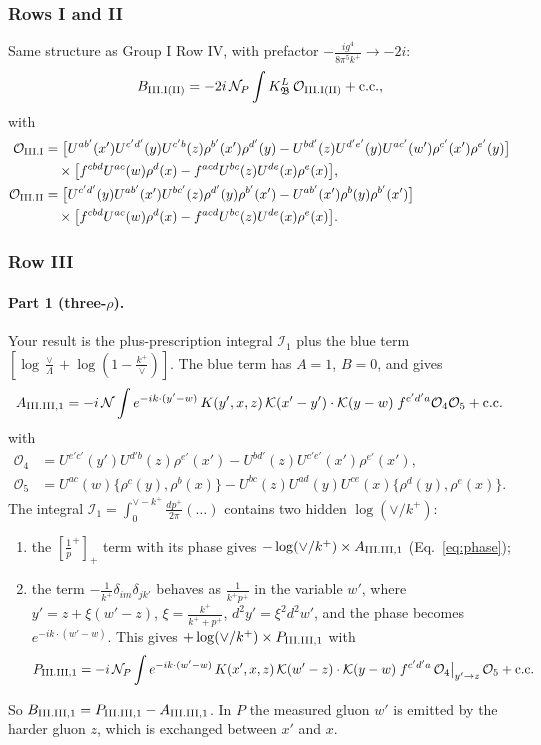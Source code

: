 \documentclass[10pt]{article}
\numberwithin{equation}{section}
\newcommand{\KK}{\mathcal K}
\newcommand{\NN}{\mathcal N}
\newcommand{\NP}{\mathcal N_{P}}
\newcommand{\pp}{p^+}
\begin{document}
\subsubsection{Rows I and II}
Same structure as Group I Row IV, with prefactor $-\frac{ig^4}{8\pi^5k^+}\to-2i$:
\begin{equation}
B_{\rm III.I(II)}=-2i\,\NP\int K^L_{\mathfrak B}\,\mathcal O_{\rm III.I(II)}+{\rm c.c.},
\end{equation}
with
\begin{align*}
\mathcal O_{\rm III.I}&=\big[U^{ab'}(x')U^{c'd'}(y)U^{c'b}(z)\rho^{b'}(x')\rho^{d'}(y)-U^{bd'}(z)U^{d'e'}(y)U^{ac'}(w')\rho^{c'}(x')\rho^{e'}(y)\big]\\
&\quad\times\big[f^{cbd}U^{ac}(w)\rho^d(x)-f^{acd}U^{bc}(z)U^{de}(x)\rho^e(x)\big],\\
\mathcal O_{\rm III.II}&=\big[U^{c'd'}(y)U^{ab'}(x')U^{bc'}(z)\rho^{d'}(y)\rho^{b'}(x')-U^{ab'}(x')\rho^b(y)\rho^{b'}(x')\big]\\
&\quad\times\big[f^{cbd}U^{ac}(w)\rho^d(x)-f^{acd}U^{bc}(z)U^{de}(x)\rho^e(x)\big].
\end{align*}

\subsubsection{Row III}\label{sec:G3III}
\paragraph{Part 1 (three-$\rho$).} Your result is the plus-prescription integral $\mathcal I_1$ plus the blue term $[\log\frac{\vee}{\Lambda}+\log(1-\frac{k^+}{\vee})]$. The blue term has $A=1$, $B=0$, and gives
\[
A_{\rm III.III,1}=-i\,\NN\int e^{-ik\cdot(y'-w)}\,K(y',x,z)\,\KK(x'-y')\cdot\KK(y-w)\;f^{c'd'a}\mathcal O_4\mathcal O_5+{\rm c.c.}
\]
with
\begin{align*}
\mathcal O_4&=U^{e'c'}(y')U^{d'b}(z)\rho^{e'}(x')-U^{bd'}(z)U^{c'e'}(x')\rho^{e'}(x'),\\
\mathcal O_5&=U^{ac}(w)\{\rho^c(y),\rho^b(x)\}-U^{bc}(z)U^{ad}(y)U^{ce}(x)\{\rho^d(y),\rho^e(x)\}.
\end{align*} The integral $\mathcal I_1=\int_0^{\vee-k^+}\frac{d\pp}{2\pi}(\dots)$ contains two hidden $\log(\vee/k^+)$:
\begin{enumerate}
\item the $[\frac1\pp]_+$ term with its phase gives $-\log(\vee/k^+)\times A_{\rm III.III,1}$ (Eq.~\eqref{eq:phase});
\item the term $-\frac1{k^+}\delta_{im}\delta_{jk'}$ behaves as $\frac{1}{k^+\pp}$ in the variable $w'$, where $y'=z+\xi(w'-z)$, $\xi=\frac{k^+}{k^++\pp}$, $d^2y'=\xi^2d^2w'$, and the phase becomes $e^{-ik\cdot(w'-w)}$. This gives $+\log(\vee/k^+)\times P_{\rm III.III,1}$ with
\[
P_{\rm III.III,1}=-i\,\NP\int e^{-ik\cdot(w'-w)}\,K(x',x,z)\,\KK(w'-z)\cdot\KK(y-w)\;f^{c'd'a}\,\mathcal O_4\big|_{y'\to z}\,\mathcal O_5+{\rm c.c.}
\]
\end{enumerate}
So $B_{\rm III.III,1}=P_{\rm III.III,1}-A_{\rm III.III,1}$. In $P$ the measured gluon $w'$ is emitted by the harder gluon $z$, which is exchanged between $x'$ and $x$.
\end{document}
